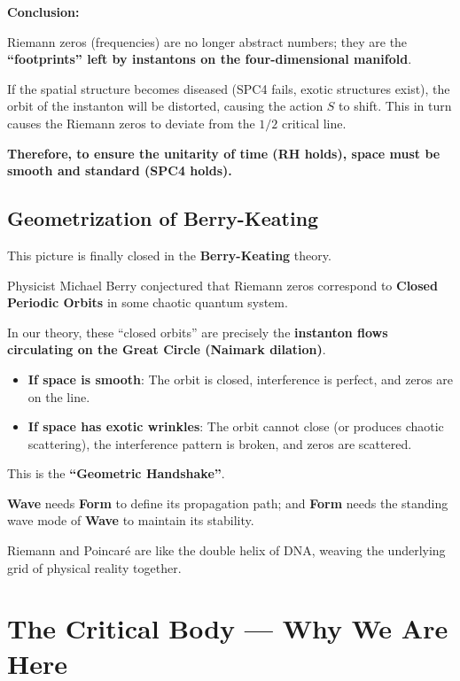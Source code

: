 \textbf{Conclusion:}

Riemann zeros (frequencies) are no longer abstract numbers; they are the \textbf{``footprints'' left by instantons on the four-dimensional manifold}.

If the spatial structure becomes diseased (SPC4 fails, exotic structures exist), the orbit of the instanton will be distorted, causing the action $S$ to shift. This in turn causes the Riemann zeros to deviate from the $1/2$ critical line.

\textbf{Therefore, to ensure the unitarity of time (RH holds), space must be smooth and standard (SPC4 holds).}

\subsection{Geometrization of Berry-Keating}

This picture is finally closed in the \textbf{Berry-Keating} theory.

Physicist Michael Berry conjectured that Riemann zeros correspond to \textbf{Closed Periodic Orbits} in some chaotic quantum system.

In our theory, these ``closed orbits'' are precisely the \textbf{instanton flows circulating on the Great Circle (Naimark dilation)}.

\begin{itemize}
\item \textbf{If space is smooth}: The orbit is closed, interference is perfect, and zeros are on the line.

\item \textbf{If space has exotic wrinkles}: The orbit cannot close (or produces chaotic scattering), the interference pattern is broken, and zeros are scattered.
\end{itemize}

This is the \textbf{``Geometric Handshake''}.

\textbf{Wave} needs \textbf{Form} to define its propagation path; and \textbf{Form} needs the standing wave mode of \textbf{Wave} to maintain its stability.

Riemann and Poincaré are like the double helix of DNA, weaving the underlying grid of physical reality together.

\section{The Critical Body — Why We Are Here}

